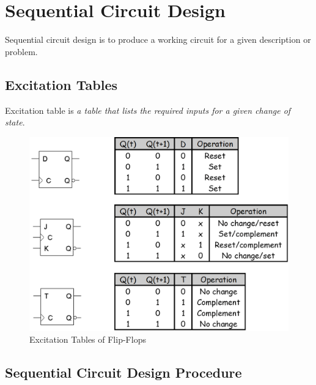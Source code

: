 \vspace*{\fill}
\columnbreak

\section{Sequential Circuit Design}
\label{sec:seq-circ-design}

Sequential circuit design is to produce a working circuit for a given description or problem.

\subsection{Excitation Tables}

Excitation table is \textit{a table that lists the required inputs for a given change of state}.
\begin{figure}[H]
  \centering
  \includegraphics[width=\linewidth]{img/excitation-tables.png}
  \caption{Excitation Tables of Flip-Flops}
  \label{fig:excitation-tables}
\end{figure}

\subsection{Sequential Circuit Design Procedure}
\label{subsec:seq-circ-design-procedure}

